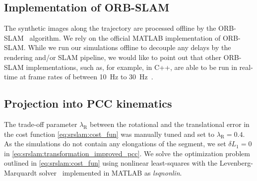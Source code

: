 \subsection{Implementation of ORB-SLAM}
The synthetic images along the trajectory are processed offline by the ORB-SLAM~\citep{mur2017orb} algorithm. We rely on the official MATLAB implementation of ORB-SLAM. While we run our simulations offline to decouple any delays by the rendering and/or \gls{SLAM} pipeline, we would like to point out that other ORB-SLAM implementations, such as, for example, in C++, are able to be run in real-time at frame rates of between \SI{10}{Hz} to \SI{30}{Hz}~\citep{mur2017orb}.

\subsection{Projection into PCC kinematics}
The trade-off parameter $\lambda_\mathrm{R}$ between the rotational and the translational error in the cost function \eqref{eq:srslam:cost_fun} was manually tuned and set to $\lambda_\mathrm{R}=0.4$.
As the simulations do not contain any elongations of the segment, we set $\delta L_1 = 0$ in \eqref{eq:srslam:transformation_improved_pcc}. 
We solve the optimization problem outlined in \eqref{eq:srslam:cost_fun} using nonlinear least-squares with the Levenberg-Marquardt solver~\citep{levenberg1944method, marquardt1963algorithm} implemented in MATLAB as \emph{lsqnonlin}.

